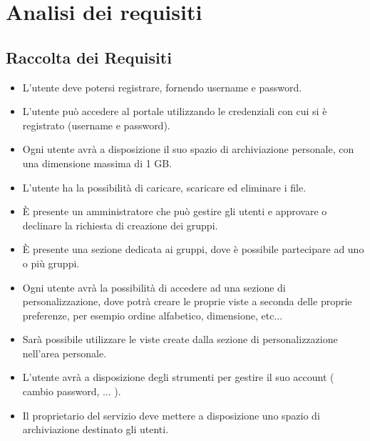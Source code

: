 \chapter*{Analisi dei requisiti}

\section*{Raccolta dei Requisiti}

\begin{itemize}

  \item L'utente deve potersi registrare, fornendo username e password.
  
  \item L'utente può accedere al portale utilizzando le credenziali con cui si è registrato (username e password).
  
  \item Ogni utente avrà a disposizione il suo spazio di archiviazione personale, con una dimensione massima di 1 GB.
  
  \item L'utente ha la possibilità di caricare, scaricare ed eliminare i file.
  
  \item È presente un amministratore che può gestire gli utenti e approvare o declinare la richiesta di creazione dei gruppi.
  
  \item È presente una sezione dedicata ai gruppi, dove è possibile partecipare ad uno o più gruppi.
  
  \item Ogni utente avrà la possibilità di accedere ad una sezione di
  personalizzazione, dove potrà creare le proprie viste a seconda delle proprie preferenze, per esempio ordine alfabetico, dimensione, etc...
  
  \item Sarà possibile utilizzare le viste create dalla sezione di personalizzazione nell'area personale.
  
  \item L'utente avrà a disposizione degli strumenti per gestire il suo account ( cambio password, ... ).
  
  \item Il proprietario del servizio deve mettere a disposizione uno spazio di archiviazione destinato gli utenti.
  
\end{itemize}

